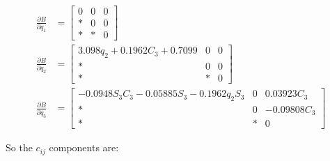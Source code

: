\begin{align*}
\frac{\partial B}{\partial q_1}&=\begin{bmatrix}
0&0&0\\ *&0&0\\ *&*&0
\end{bmatrix}\\
\frac{\partial B}{\partial q_2}&=\begin{bmatrix}
3.098q_2+0.1962C_3+0.7099&0&0\\ *&0&0\\ *&*&0
\end{bmatrix}\\
\frac{\partial B}{\partial q_3}&=\begin{bmatrix} 
- 0.0948S_3C_3 - 0.05885S_3 - 0.1962q_2S_3&                0& 0.03923C_3\\
                                                     *&                0& -0.09808C_3\\
                                         *& *&                0
\end{bmatrix}
\end{align*}

So the $c_{ij}$ components are:

